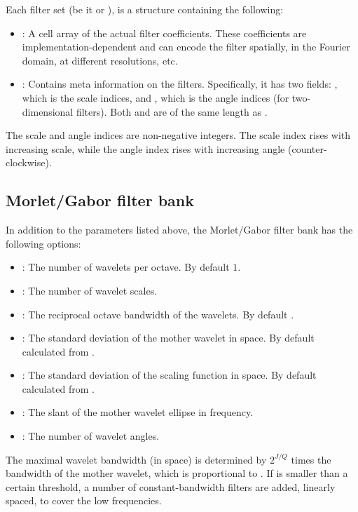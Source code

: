 \documentclass[twocolumn]{article}
\begin{document}
Each filter set (be it  or ), is a structure  containing the following:
\begin{itemize}
	\item {}: A cell array of the actual filter coefficients. These coefficients are implementation-dependent and can encode the filter spatially, in the Fourier domain, at different resolutions, etc.
	\item {}: Contains meta information on the filters. Specifically, it has two fields: , which is the scale indices, and , which is the angle indices (for two-dimensional filters). Both  and  are of the same length as .
\end{itemize}

The scale and angle indices are non-negative integers. The scale index rises with increasing scale, while the angle index rises with increasing angle (counter-clockwise).

\subsection{Morlet/Gabor filter bank}

In addition to the parameters listed above, the Morlet/Gabor filter bank has the following options:
\begin{itemize}
	\item {}: The number of wavelets per octave. By default $1$.
	\item {}: The number of wavelet scales.
	\item {}: The reciprocal octave bandwidth of the wavelets. By default .
	\item {}: The standard deviation of the mother wavelet in space. By default calculated from .
	\item {}: The standard deviation of the scaling function in space. By default calculated from .
	\item {}: The slant of the mother wavelet ellipse in frequency.
	\item {}: The number of wavelet angles.
\end{itemize}
The maximal wavelet bandwidth (in space) is determined by $2^{J/Q}$ times the bandwidth of the mother wavelet, which is proportional to . If  is smaller than a certain threshold, a number of constant-bandwidth filters are added, linearly spaced, to cover the low frequencies.
\end{document}
